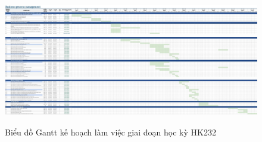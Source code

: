 \begin{figure} [H]
    \centering
    \includegraphics[width = \linewidth]{Content/Giới thiệu đề tài/images/PCCV_HK232_1.jpg}
    \includegraphics[width = \linewidth]{Content/Giới thiệu đề tài/images/PCCV_HK232_2.jpg}
    \includegraphics[width = \linewidth]{Content/Giới thiệu đề tài/images/PCCV_HK232_3.jpg}
    \vspace{0.5cm}
    \caption{Biểu đồ Gantt kế hoạch làm việc giai đoạn học kỳ HK232}
    \label{fig:Biểu đồ Gantt kế hoạch làm việc giai đoạn học kỳ HK232}
\end{figure}

